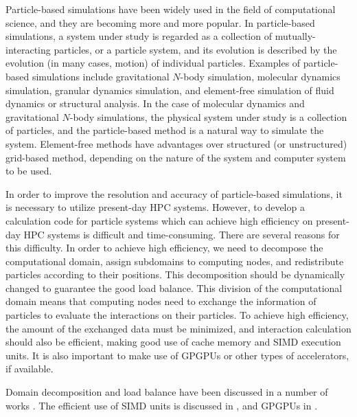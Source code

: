Particle-based simulations have been widely used in the field of
computational science, and they are becoming more and more
popular. In particle-based simulations, a system under study is
regarded as a collection of mutually-interacting particles, or
a particle system,  and its
evolution is described by the evolution (in many cases, motion) of
individual particles. Examples of particle-based simulations include
gravitational $N$-body simulation, molecular dynamics simulation,
granular dynamics simulation, and element-free simulation of fluid
dynamics or structural analysis. In the case of molecular dynamics and
gravitational $N$-body simulations, the physical system under study is
a collection of particles, and the particle-based method is a natural
way to simulate the system. Element-free methods have advantages over
structured (or unstructured) grid-based method, depending on the
nature of the system and computer system to be used. 

In order to improve the resolution and accuracy of particle-based
simulations, it is necessary to utilize present-day HPC systems.
However, to develop a calculation code for particle systems
which can achieve high efficiency on present-day HPC systems is
difficult and time-consuming. There are several reasons for this
difficulty. In order to achieve high efficiency, we need to decompose
the computational domain, assign subdomains to computing nodes, and
redistribute particles according to their positions. This
decomposition should be dynamically changed to guarantee the good load
balance. This division of the computational domain means that
computing nodes need to exchange the information of particles to
evaluate the interactions on their particles. To achieve high
efficiency, the amount of the exchanged data must be minimized, and
interaction calculation should also be efficient, making good use of
cache memory and SIMD execution units. It is also important to make
use of GPGPUs or other types of accelerators, if available.

Domain decomposition and load balance have been discussed in a number
of works \cite{1994JCoPh.111..136S, 1996NewA....1..133D,
confscWarrenSBGSW97, 2004PASJ...56..521M, ishiyama:greem,
ishiyama:gordonbell}.  The efficient use of SIMD units is discussed
in \cite{2006NewA...12..169N,2012NewA...17...82T,2013NewA...19...74T},
and GPGPUs in \cite{hamada2009novel, 2009NewA...14..630G,
Hamada:2009:THN:1654059.1654123, Hamada:2010:TAN:1884643.1884644,
2012JCoPh.231.2825B, Bedorf:2014:PGT:2683593.2683600}.

